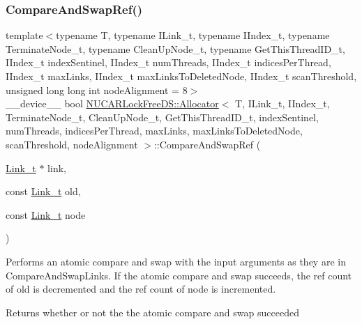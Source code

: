 \subsubsection{\texorpdfstring{Compare\+And\+Swap\+Ref()}{CompareAndSwapRef()}}
{\footnotesize\ttfamily template$<$typename T, typename I\+Link\+\_\+t, typename I\+Index\+\_\+t, typename Terminate\+Node\+\_\+t, typename Clean\+Up\+Node\+\_\+t, typename Get\+This\+Thread\+I\+D\+\_\+t, I\+Index\+\_\+t index\+Sentinel, I\+Index\+\_\+t num\+Threads, I\+Index\+\_\+t indices\+Per\+Thread, I\+Index\+\_\+t max\+Links, I\+Index\+\_\+t max\+Links\+To\+Deleted\+Node, I\+Index\+\_\+t scan\+Threshold, unsigned long long int node\+Alignment = 8$>$ \\
\+\_\+\+\_\+device\+\_\+\+\_\+ bool \mbox{\hyperlink{class_n_u_c_a_r_lock_free_d_s_1_1_allocator}{N\+U\+C\+A\+R\+Lock\+Free\+D\+S\+::\+Allocator}}$<$ T, I\+Link\+\_\+t, I\+Index\+\_\+t, Terminate\+Node\+\_\+t, Clean\+Up\+Node\+\_\+t, Get\+This\+Thread\+I\+D\+\_\+t, index\+Sentinel, num\+Threads, indices\+Per\+Thread, max\+Links, max\+Links\+To\+Deleted\+Node, scan\+Threshold, node\+Alignment $>$\+::Compare\+And\+Swap\+Ref (\begin{DoxyParamCaption}\item[{\mbox{\hyperlink{class_n_u_c_a_r_lock_free_d_s_1_1_allocator_a5508d82b795e6c1977bebb67b5e5b686}{Link\+\_\+t}} $\ast$}]{link,  }\item[{const \mbox{\hyperlink{class_n_u_c_a_r_lock_free_d_s_1_1_allocator_a5508d82b795e6c1977bebb67b5e5b686}{Link\+\_\+t}}}]{old,  }\item[{const \mbox{\hyperlink{class_n_u_c_a_r_lock_free_d_s_1_1_allocator_a5508d82b795e6c1977bebb67b5e5b686}{Link\+\_\+t}}}]{node }\end{DoxyParamCaption})\hspace{0.3cm}{\ttfamily [inline]}}

Performs an atomic compare and swap with the input arguments as they are in Compare\+And\+Swap\+Links. If the atomic compare and swap succeeds, the ref count of old is decremented and the ref count of node is incremented. \begin{DoxyReturn}{Returns}
whether or not the the atomic compare and swap succeeded 
\end{DoxyReturn}
\mbox{\label{class_n_u_c_a_r_lock_free_d_s_1_1_allocator_a3f2abafd921e216ec08249198da2d3d2}} 
